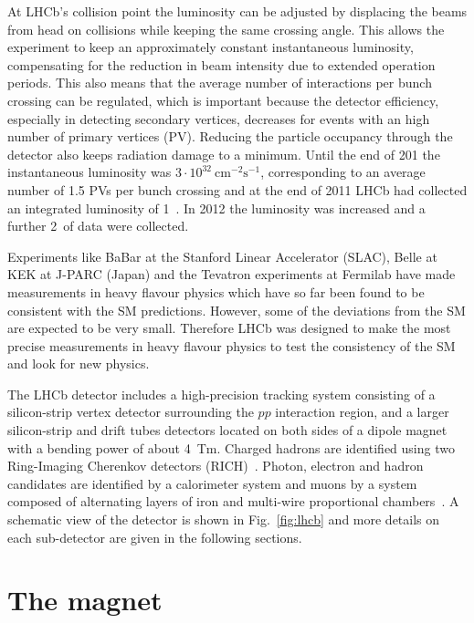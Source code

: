 At LHCb's collision point the luminosity can be adjusted by displacing the beams from head on collisions
while keeping the same crossing angle. This allows the experiment to keep an approximately constant instantaneous
luminosity, compensating for the reduction in beam intensity due to extended operation periods. This also means that
the average number of interactions per bunch crossing can be regulated, which is important
because the detector efficiency, especially in detecting secondary vertices, decreases for events with an high number
of primary vertices (PV). Reducing the particle occupancy through the detector also keeps radiation damage to a minimum. 
Until the end of 201 the instantaneous luminosity was $3 \cdot 10^{32}~\mbox{cm}^{-2}\mbox{s}^{-1}$, corresponding 
to an average number of 1.5 PVs per bunch crossing and at the end of 2011 LHCb had collected an integrated
luminosity of 1~\invfb. In 2012 the luminosity was increased and a further 2~\invfb of data were collected.

Experiments like BaBar at the Stanford Linear Accelerator (SLAC), Belle at KEK at J-PARC (Japan)
and the Tevatron experiments at Fermilab have made measurements in heavy flavour physics
which have so far been found to be consistent with the SM predictions. However, some of the deviations from the
SM are expected to be very small. Therefore LHCb was designed to make the most precise measurements
in heavy flavour physics to test the consistency of the SM and look for new physics.

The LHCb detector includes a high-precision tracking system consisting of a silicon-strip
vertex detector surrounding the $pp$ interaction region, and a larger silicon-strip and drift tubes detectors located
on both sides of a dipole magnet with a bending power of about 4~Tm.
Charged hadrons are identified using two
Ring-Imaging Cherenkov detectors (RICH)~\cite{LHCb-DP-2012-003}. Photon, electron and hadron candidates are
identified by a calorimeter system and muons by a system composed of alternating layers of iron
and multi-wire proportional chambers~\cite{LHCb-DP-2012-002}. A schematic view of the detector is shown in Fig.~\ref{fig:lhcb}
and more details on each sub-detector are given in the following sections.

\section{The magnet}

